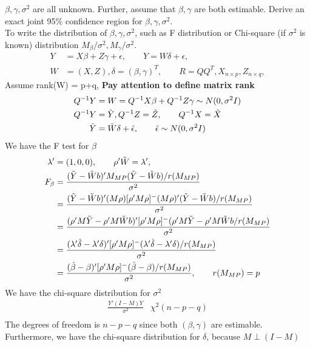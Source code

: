\begin{itemize}
$\beta, \gamma, \sigma^2$ are all unknown. Further, assume that $\beta, \gamma$ are both estimable. Derive an exact joint 95$\%$ confidence region for $\beta, \gamma, \sigma^2$.\\
To write the distribution of $\beta, \gamma, \sigma^2$, such as F distribution or Chi-square (if $\sigma^2$ is known) distribution $M_{\beta}/ \sigma^2, M_{\gamma}/ \sigma^2$.
\begin{align*}
Y &= X\beta + Z\gamma + \epsilon, \qquad Y = W\delta + \epsilon, \\
W &= (X, Z), \delta = (\beta, \gamma)^T, \qquad R = Q Q^{T}, X_{n \times p}, Z_{n \times q}, 
\end{align*}
Assume rank(W) = p+q, \textbf{Pay attention to define matrix rank}
\begin{align*}
Q^{-1}Y &= W = Q^{-1}X \beta + Q^{-1}Z \gamma \sim N(0, \sigma^2 I)\\
Q^{-1}Y &= \Tilde{Y}, Q^{-1}Z = \Tilde{Z}, \qquad Q^{-1}X = \Tilde{X}\\
\Tilde{Y} &= \Tilde{W} \delta + \Tilde{\epsilon},  \qquad \Tilde{\epsilon} \sim N(0,\sigma^2 I)
\end{align*}
We have the F test for $\beta$  
\begin{align*}
\lambda' &= (1,0,0), \qquad \rho'\Tilde{W} = \lambda', \\
F_{\beta} &= \frac{(\Tilde{Y}- \Tilde{W} b)'M_{MP} (\Tilde{Y}- \Tilde{W} b)/r(M_{MP})}{\sigma^2}\\
 &= \frac{(\Tilde{Y}- \Tilde{W} b)' (M\rho) [\rho' M \rho]^{-} (M\rho)' (\Tilde{Y}- \Tilde{W} b)/r(M_{MP})}{\sigma^2} \\
 &= \frac{( \rho'M \Tilde{Y}- \rho'M \Tilde{W} b)'  [\rho' M \rho]^{-} ( \rho'M \Tilde{Y}-  \rho'M \Tilde{W} b/r(M_{MP})}{\sigma^2} \\
&=  \frac{(\lambda' \hat{\delta} - \lambda' \delta)'  [\rho' M \rho]^{-} (\lambda' \hat{\delta} - \lambda' \delta)/r(M_{MP})}{\sigma^2} \\
&=  \frac{(\hat{\beta} - \beta)'  [\rho' M \rho]^{-} (\hat{\beta} - \beta)/r(M_{MP})}{\sigma^2}, \qquad r(M_{MP}) = p
\end{align*}
We have the chi-square distribution for $\sigma^2$ 
\begin{align*}
\frac{Y'(I-M) Y}{\sigma^2} & \chi^2(n-p-q) \\
\end{align*}
The degrees of freedom is $n-p-q$ since both $(\beta, \gamma)$ are estimable. \\
Furthermore, we have the chi-square distribution for $\delta$, because $M \perp (I-M)$

\end{itemize}
